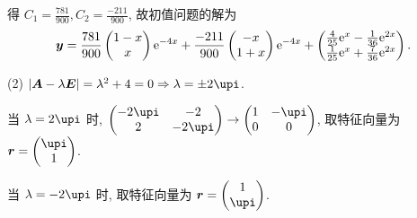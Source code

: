 \begin{solution}
  得 $C_1=\frac{781}{900},C_2=\frac{-211}{900}$, 故初值问题的解为
  \[\bm{y} = 
    \frac{781}{900}\begin{pmatrix}1-x\\x\end{pmatrix}\mathrm{e}^{-4x}
    + \frac{-211}{900}\begin{pmatrix}-x\\1+x\end{pmatrix}\mathrm{e}^{-4x}
    + \begin{pmatrix}
      \frac{4}{25}\mathrm{e}^x-\frac{1}{36}\mathrm{e}^{2x} \\
      \frac{1}{25}\mathrm{e}^x+\frac{7}{36}\mathrm{e}^{2x}
    \end{pmatrix}.\]

  (2) $|\bm{A}-\lambda\bm{E}|=\lambda^2+4=0\Rightarrow\lambda=\pm2\upi$.

  当 $\lambda=2\upi$ 时, $\begin{pmatrix}-2\upi&-2\\2&-2\upi\end{pmatrix}\to\begin{pmatrix}1&-\upi\\0&0\end{pmatrix}$, 
  取特征向量为 $\bm{r}=\begin{pmatrix}\upi\\1\end{pmatrix}$.

  当 $\lambda=-2\upi$ 时, 取特征向量为 $\bm{r}=\begin{pmatrix}1\\\upi\end{pmatrix}$.


\end{solution}
